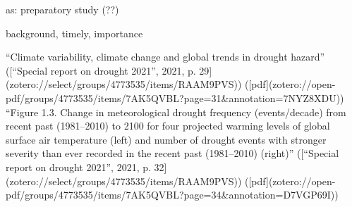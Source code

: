 

as: preparatory study (??)


background, timely, importance






“Climate variability, climate change and global trends in drought hazard” ([“Special report on drought 2021”, 2021, p. 29](zotero://select/groups/4773535/items/RAAM9PVS)) ([pdf](zotero://open-pdf/groups/4773535/items/7AK5QVBL?page=31&annotation=7NYZ8XDU))
“Figure 1.3. Change in meteorological drought frequency (events/decade) from recent past (1981–2010) to 2100 for four projected warming levels of global surface air temperature (left) and number of drought events with stronger severity than ever recorded in the recent past (1981–2010) (right)” ([“Special report on drought 2021”, 2021, p. 32](zotero://select/groups/4773535/items/RAAM9PVS)) ([pdf](zotero://open-pdf/groups/4773535/items/7AK5QVBL?page=34&annotation=D7VGP69I))

